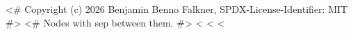 <# Copyright (c) 2026 Benjamin Benno Falkner, SPDX-License-Identifier: MIT #>
<# Nodes with sep between them. #>
<%
<%
<%
